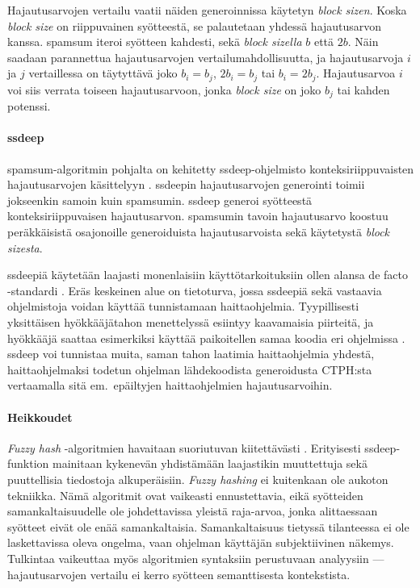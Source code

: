 \documentclass[10pt]{article}
\begin{document}
	Hajautusarvojen vertailu vaatii näiden generoinnissa käytetyn
	\textit{block sizen}. Koska \textit{block size} on riippuvainen syötteestä,
	se palautetaan yhdessä hajautusarvon kanssa. spamsum iteroi
	syötteen kahdesti, sekä \textit{block sizella} $b$ että $2b$.
	Näin saadaan parannettua hajautusarvojen vertailumahdollisuutta, ja
	hajautusarvoja $i$ ja $j$ vertaillessa on täytyttävä joko
	$b_i = b_j$, $2b_i = b_j$ tai $b_i = 2b_j$. Hajautusarvoa $i$ voi
	siis verrata toiseen hajautusarvoon, jonka \textit{block size} on joko $b_j$ tai kahden potenssi.

	\paragraph{ssdeep}
	spamsum-algoritmin pohjalta on kehitetty ssdeep-ohjelmisto
	konteksiriippuvaisten hajautusarvojen käsittelyyn \parencite{SSDEEP}. ssdeepin
	hajautusarvojen generointi toimii jokseenkin samoin kuin
	spamsumin. ssdeep generoi syötteestä konteksiriippuvaisen
	hajautusarvon. spamsumin tavoin
	hajautusarvo koostuu peräkkäisistä osajonoille generoiduista
	hajautusarvoista sekä käytetystä \textit{block sizesta}.

	ssdeepiä käytetään laajasti monenlaisiin käyttötarkoituksiin
	ollen alansa de facto -standardi \parencite{SSDEEP}.
	Eräs keskeinen alue on tietoturva, jossa ssdeepiä
	sekä vastaavia ohjelmistoja voidan käyttää tunnistamaan
	haittaohjelmia. Tyypillisesti yksittäisen hyökkääjätahon
	menettelyssä esiintyy kaavamaisia piirteitä, ja hyökkääjä
	saattaa esimerkiksi käyttää paikoitellen samaa koodia eri
	ohjelmissa \parencite{RANSO}. ssdeep voi tunnistaa muita, saman tahon laatimia
	haittaohjelmia yhdestä, haittaohjelmaksi todetun ohjelman
	lähdekoodista generoidusta CTPH:sta vertaamalla sitä
	em.\ epäiltyjen haittaohjelmien hajautusarvoihin.

	\paragraph{Heikkoudet}
	\textit{Fuzzy hash} -algoritmien havaitaan suoriutuvan kiitettävästi \parencite{RANSO}.
	Erityisesti ssdeep-funktion mainitaan kykenevän yhdistämään laajastikin
	muuttettuja sekä puuttellisia tiedostoja alkuperäisiin. \textit{Fuzzy hashing} ei
	kuitenkaan ole aukoton tekniikka. Nämä algoritmit ovat vaikeasti
	ennustettavia, eikä syötteiden samankaltaisuudelle ole johdettavissa
	yleistä raja-arvoa, jonka alittaessaan syötteet eivät ole enää samankaltaisia.
	Samankaltaisuus tietyssä tilanteessa ei ole laskettavissa oleva ongelma,
	vaan ohjelman käyttäjän subjektiivinen näkemys.
	Tulkintaa vaikeuttaa myös algoritmien syntaksiin perustuvaan analyysiin
	--- hajautusarvojen vertailu ei kerro syötteen semanttisesta kontekstista.
\end{document}
